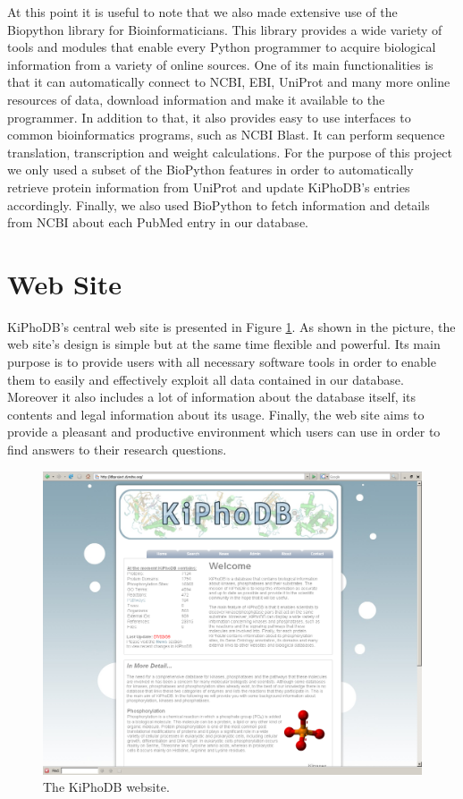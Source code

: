 At this point it is useful to note that we also made extensive use of the Biopython library for Bioinformaticians.
This library provides a wide variety of tools and modules that enable every Python programmer to acquire biological information from a variety of online sources.
One of its main functionalities is that it can automatically connect to NCBI, EBI, UniProt and many more online resources of data, download information and make it available to the programmer.
In addition to that, it also provides easy to use interfaces to common bioinformatics programs, such as NCBI Blast.
It can perform sequence translation, transcription and weight calculations.
For the purpose of this project we only used a subset of the BioPython features in order to automatically retrieve protein information from UniProt and update KiPhoDB's entries accordingly.
Finally, we also used BioPython to fetch information and details from NCBI about each PubMed entry in our database.

\section{Web Site}
KiPhoDB's central web site is presented in Figure \ref{website}.
As shown in the picture, the web site's design is simple but at the same time flexible and powerful.
Its main purpose is to provide users with all necessary software tools in order to enable them to easily and effectively exploit all data contained in our database.
Moreover it also includes a lot of information about the database itself, its contents and legal information about its usage.
Finally, the web site aims to provide a pleasant and productive environment which users can use in order to find answers to their research questions.

\begin{figure}[htp]
\centering
\includegraphics[scale=0.35]{pictures/website.png}
\caption{The KiPhoDB website.}
\label{website}
\end{figure}

